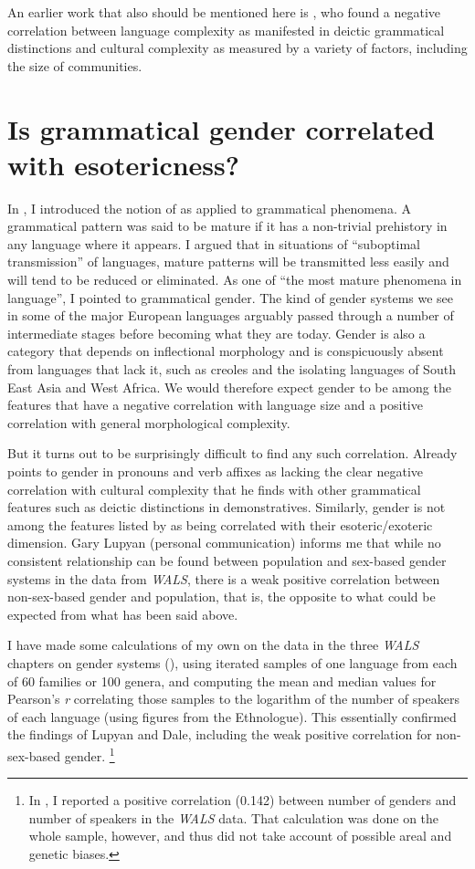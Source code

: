 \documentclass[output=collectionpaper]{langsci/langscibook}
\begin{document}
An earlier work that also should be mentioned here is \citet{Perkins1992}, who found a negative correlation between language complexity as manifested in deictic grammatical distinctions and cultural complexity as measured by a variety of factors, including the size of communities.

\section{Is grammatical gender correlated with esotericness?}
\largerpage[2]
In \citet{Dahl2004}, I introduced the notion of  as applied to grammatical phenomena. A grammatical pattern was said to be mature if it has a non-trivial prehistory in any language where it appears. I argued that in situations of ``suboptimal transmission'' of languages, mature patterns will be transmitted less easily and will tend to be reduced or eliminated.  As one of ``the most mature phenomena in language'', I pointed to grammatical gender. The kind of gender systems we see in some of the major European languages arguably passed through a number of intermediate stages before becoming what they are today. Gender is also a category that depends on inflectional morphology and is conspicuously absent from languages that lack it, such as creoles and the isolating languages of South East Asia and West Africa. We would therefore expect gender to be among the features that have a negative correlation with language size and a positive correlation with general morphological complexity.

But it turns out to be surprisingly difficult to find any such correlation. Already \citet[157]{Perkins1992} points to gender in pronouns and verb affixes as lacking the clear negative correlation with cultural complexity that he finds with other grammatical features such as deictic distinctions in demonstratives. Similarly, gender is not among the features listed by \citet{Lupyan2010} as being correlated with their esoteric/exoteric dimension. Gary Lupyan (personal communication) informs me that while no consistent relationship can be found between population and sex-based gender systems in the data from \textit{WALS}, there is a weak positive correlation between non-sex-based gender and population, that is, the opposite to what could be expected from what has been said above.

I have made some calculations of my own on the data in the three \textit{WALS} chapters on gender systems (\citealt{Corbett2013,Corbett2013a,Corbett2013b}), using iterated samples of one language from each of 60 families or 100 genera, and computing the mean and median values for Pearson’s \textit{r} correlating those samples to the logarithm of the number of speakers of each language (using figures from the Ethnologue). This essentially confirmed the findings of Lupyan and Dale, including the weak positive correlation for non-sex-based gender.%
\footnote{In \citet{Dahl2011}, I reported a positive correlation (0.142) between number of genders and number of speakers in the \textit{WALS} data. That calculation was done on the whole sample, however, and thus did not take account of possible areal and genetic biases.}
\end{document}
